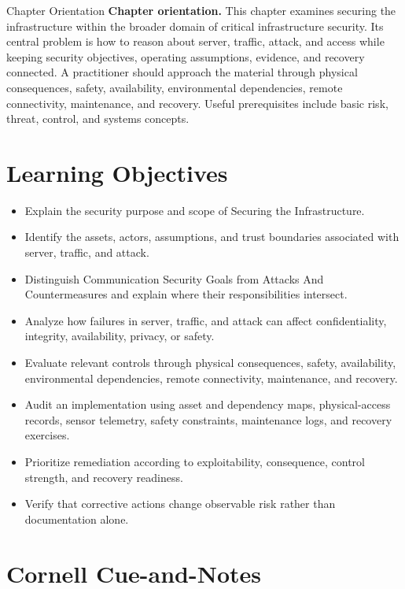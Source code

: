 \documentclass[11pt,letterpaper]{article}
\title{\CornellDocumentTitle}
\author{}
\date{}
\begin{document}
\maketitle
\begin{CornellOverviewBox}{Chapter Orientation}
\textbf{Chapter orientation.} This chapter examines securing the infrastructure within the broader domain of critical infrastructure security. Its central problem is how to reason about server, traffic, attack, and access while keeping security objectives, operating assumptions, evidence, and recovery connected. A practitioner should approach the material through physical consequences, safety, availability, environmental dependencies, remote connectivity, maintenance, and recovery. Useful prerequisites include basic risk, threat, control, and systems concepts.
\end{CornellOverviewBox}
\section*{Learning Objectives}
\begin{itemize}
\item Explain the security purpose and scope of Securing the Infrastructure.
\item Identify the assets, actors, assumptions, and trust boundaries associated with server, traffic, and attack.
\item Distinguish Communication Security Goals from Attacks And Countermeasures and explain where their responsibilities intersect.
\item Analyze how failures in server, traffic, and attack can affect confidentiality, integrity, availability, privacy, or safety.
\item Evaluate relevant controls through physical consequences, safety, availability, environmental dependencies, remote connectivity, maintenance, and recovery.
\item Audit an implementation using asset and dependency maps, physical-access records, sensor telemetry, safety constraints, maintenance logs, and recovery exercises.
\item Prioritize remediation according to exploitability, consequence, control strength, and recovery readiness.
\item Verify that corrective actions change observable risk rather than documentation alone.
\end{itemize}
\section*{Cornell Cue-and-Notes}
\end{document}
